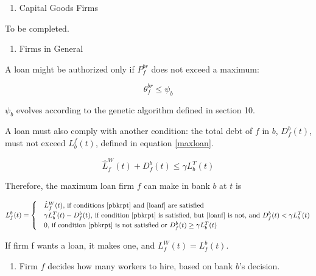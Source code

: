 \documentclass[11pt,]{article}
\providecommand{\tightlist}{%
\setlength{\itemsep}{0pt}\setlength{\parskip}{0pt}}
\begin{document}
\begin{enumerate}
\def\labelenumi{\roman{enumi}.}
\setcounter{enumi}{1}
\tightlist
\item
  Capital Goods Firms
\end{enumerate}

To be completed.

\begin{enumerate}
\def\labelenumi{\roman{enumi}.}
\setcounter{enumi}{2}
\tightlist
\item
  Firms in General
\end{enumerate}

A loan might be authorized only if \(P_f^{br}\) does not exceed a
maximum:

\begin{equation}\label{pbkrpt}
    \theta_f^{br} \leq \psi_b
  \end{equation}

\(\psi_b\) evolves according to the genetic algorithm defined in section
10.

A loan must also comply with another condition: the total debt of \(f\)
in \(b\), \(D_f^b(t)\), must not exceed \(L^f_b(t)\), defined in
equation \ref{maxloan}.

\begin{equation}\label{loanf}
    \hat{L}^W_f(t) + D_f^b(t) \leq \gamma L^T_b(t)
  \end{equation}

Therefore, the maximum loan firm \(f\) can make in bank \(b\) at \(t\)
is

\begin{equation}
    L_f^b(t) =
    \begin{cases}
      & \hat{L}^W_f(t) \text{, if conditions \ref{pbkrpt} and \ref{loanf} are satisfied} \\
      & \gamma L^T_b(t) - D_f^b(t) \text{, if condition \ref{pbkrpt} is satisfied, but \ref{loanf} is not, and } D_f^b(t) < \gamma L^T_b(t) \\  
      & 0 \text{, if condition \ref{pbkrpt} is not satisfied or } D_f^b(t) \geq \gamma L^T_b(t)
    \end{cases}
  \end{equation}

If firm f wants a loan, it makes one, and \(L^W_f(t) = L_f^b(t)\).

\begin{enumerate}
\def\labelenumi{\alph{enumi}.}
\setcounter{enumi}{3}
\tightlist
\item
  Firm \(f\) decides how many workers to hire, based on bank \(b\)'s
  decision.
\end{enumerate}
\end{document}
